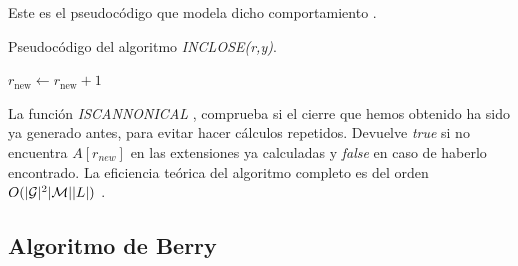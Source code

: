 \documentclass[oneside,openright,titlepage,numbers=noenddot,openany,headinclude,footinclude=true,
cleardoublepage=empty,abstractoff,BCOR=5mm,paper=a4,fontsize=12pt,main=spanish]{scrreprt}
\begin{document}
Este es el pseudocódigo que modela dicho comportamiento \cite{inclose}.

\begin{algorithm}[H]
\caption{Pseudocódigo del algoritmo \textit{INCLOSE(r,y)}.}
\label{code:inclose}
            
     
     $r_{\text{new}} \leftarrow r_{\text{new}} +1$\\

\end{algorithm}

La función \textit{ISCANNONICAL} \cite{inclose}, comprueba si el cierre que hemos obtenido ha sido ya generado antes, para evitar hacer cálculos repetidos. Devuelve \textit{true} si no encuentra $A[r_{new}]$ en las extensiones ya calculadas y \textit{false} en caso de haberlo encontrado.  La eficiencia teórica del algoritmo completo es del orden $O(|\mathcal{G}|^2 |\mathcal{M}| |L|)$ \cite{inclose}.

\subsection{Algoritmo de Berry}
\label{alg:berry}
\end{document}
